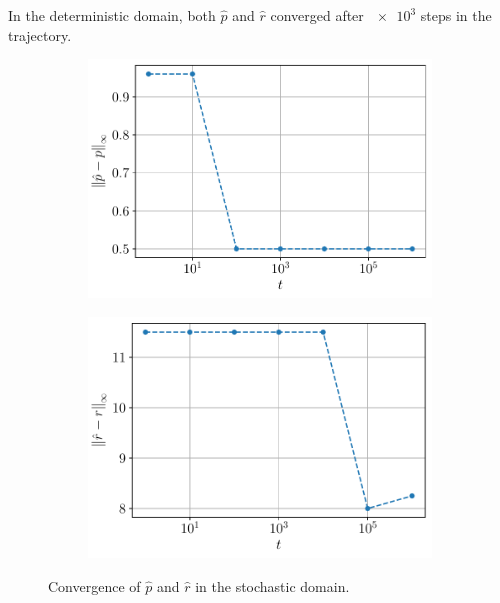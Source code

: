 \documentclass[a4paper, 12pt]{article}
\begin{document}
    In the deterministic domain, both $\hat{p}$ and $\hat{r}$ converged after $\num{e3}$ steps in the trajectory.
    
    \begin{figure}[h]
        \begin{subfigure}[b]{0.47\textwidth}
            \centering
            \includegraphics[width=\textwidth]{resources/pdf/4_p_stochastic.pdf}
        \end{subfigure}
        \hfill
        \begin{subfigure}[b]{0.47\textwidth}
            \centering
            \includegraphics[width=\textwidth]{resources/pdf/4_r_stochastic.pdf}
        \end{subfigure}
        \caption{Convergence of $\hat{p}$ and $\hat{r}$ in the stochastic domain.}
        \label{fig:si.convergence.speeds.stochastic}
    \end{figure}
    
\end{document}
